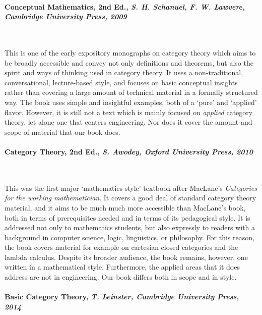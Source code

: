 \documentclass[10pt, article, one side]{memoir}
\begin{document}
    \paragraph{Conceptual Mathematics, 2nd Ed., \emph{S.
            H.
            Schanuel, F.
            W.
            Lawvere, Cambridge University Press, 2009}~\cite{lawvere2009conceptual}}
    \

    This is one of the early expository monographs on category theory which aims to be broadly accessible and convey not only definitions and theorems, but also the spirit and ways of thinking used in category theory.
    It uses a non-traditional, conversational, lecture-based style, and focuses on basic conceptual insights rather than covering a large amount of technical material in a formally structured way.
    The book uses simple and insightful examples, both of a `pure' and `applied' flavor.
    However, it is still not a text which is mainly focused on \emph{applied} category theory, let alone one that centers engineering.
    Nor does it cover the amount and scope of material that our book does.

    \paragraph{Category Theory, 2nd Ed., \emph{S.
            Awodey, Oxford University Press, 2010}~\cite{awodey2010category}}
    \

    This was the first major `mathematics-style' textbook after MacLane's \emph{Categories for the working mathematician}.
    It covers a good deal of standard category theory material, and it aims to be much much more accessible than MacLane's book, both in terms of prerequisites needed and in terms of its pedagogical style.
    It is addressed not only to mathematics students, but also expressly to readers with a background in computer science, logic, linguistics, or philosophy.
    For this reason, the book covers material for example on cartesian closed categories and the lambda calculus.
    Despite its broader audience, the book remains, however, one written in a mathematical style.
    Furthermore, the applied areas that it does address are not in engineering.
    Our book differs both in scope and in style.

    \paragraph{Basic Category Theory, \emph{T.
            Leinster,  Cambridge University Press, 2014}~\cite{leinster2014basic}}
    \
\end{document}
